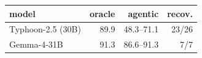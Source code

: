 \begin{tabular}{@{}lrrr@{}}
\toprule
\textbf{model} & \textbf{oracle} & \textbf{agentic} & \textbf{recov.} \\
\midrule
Typhoon-2.5 (30B) & 89.9 & 48.3--71.1 & 23/26 \\
Gemma-4-31B & 91.3 & 86.6--91.3 & 7/7 \\
\bottomrule
\end{tabular}
